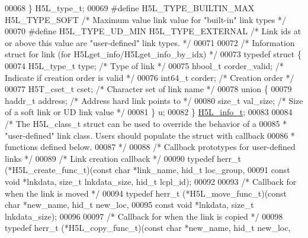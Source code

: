 \begin{DoxyCode}
00068 \} H5L\_type\_t;
00069 \textcolor{preprocessor}{#define H5L\_TYPE\_BUILTIN\_MAX H5L\_TYPE\_SOFT      }\textcolor{comment}{/* Maximum value link value for "built-in" link types */}\textcolor{preprocessor}{}
00070 \textcolor{preprocessor}{#define H5L\_TYPE\_UD\_MIN      H5L\_TYPE\_EXTERNAL  }\textcolor{comment}{/* Link ids at or above this value are "user-defined" link
       types. */}\textcolor{preprocessor}{}
00071 
00072 \textcolor{comment}{/* Information struct for link (for H5Lget\_info/H5Lget\_info\_by\_idx) */}
00073 \textcolor{keyword}{typedef} \textcolor{keyword}{struct }\{
00074     H5L\_type\_t          type;           \textcolor{comment}{/* Type of link                   */}
00075     hbool\_t             corder\_valid;   \textcolor{comment}{/* Indicate if creation order is valid */}
00076     int64\_t             corder;         \textcolor{comment}{/* Creation order                 */}
00077     H5T\_cset\_t          cset;           \textcolor{comment}{/* Character set of link name     */}
00078     \textcolor{keyword}{union }\{
00079         haddr\_t         address;        \textcolor{comment}{/* Address hard link points to    */}
00080         \textcolor{keywordtype}{size\_t}          val\_size;       \textcolor{comment}{/* Size of a soft link or UD link value */}
00081     \} u;
00082 \} \hyperlink{struct_h5_l__info__t}{H5L\_info\_t};
00083 
00084 \textcolor{comment}{/* The H5L\_class\_t struct can be used to override the behavior of a}
00085 \textcolor{comment}{ * "user-defined" link class. Users should populate the struct with callback}
00086 \textcolor{comment}{ * functions defined below.}
00087 \textcolor{comment}{ */}
00088 \textcolor{comment}{/* Callback prototypes for user-defined links */}
00089 \textcolor{comment}{/* Link creation callback */}
00090 \textcolor{keyword}{typedef} herr\_t (*H5L\_create\_func\_t)(\textcolor{keyword}{const} \textcolor{keywordtype}{char} *link\_name, hid\_t loc\_group,
00091     \textcolor{keyword}{const} \textcolor{keywordtype}{void} *lnkdata, \textcolor{keywordtype}{size\_t} lnkdata\_size, hid\_t lcpl\_id);
00092 
00093 \textcolor{comment}{/* Callback for when the link is moved */}
00094 \textcolor{keyword}{typedef} herr\_t (*H5L\_move\_func\_t)(\textcolor{keyword}{const} \textcolor{keywordtype}{char} *new\_name, hid\_t new\_loc,
00095     \textcolor{keyword}{const} \textcolor{keywordtype}{void} *lnkdata, \textcolor{keywordtype}{size\_t} lnkdata\_size);
00096 
00097 \textcolor{comment}{/* Callback for when the link is copied */}
00098 \textcolor{keyword}{typedef} herr\_t (*H5L\_copy\_func\_t)(\textcolor{keyword}{const} \textcolor{keywordtype}{char} *new\_name, hid\_t new\_loc,

\end{DoxyCode}
